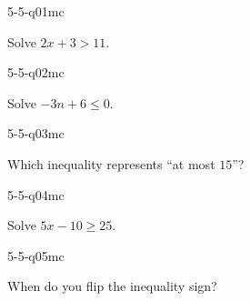 

\begin{practiceQuestion}{5-5-q01}{mc}
\begin{questionText}
Solve $2x + 3 > 11$.
\end{questionText}
\end{practiceQuestion}

\begin{practiceQuestion}{5-5-q02}{mc}
\begin{questionText}
Solve $-3n + 6 \leq 0$.
\end{questionText}
\end{practiceQuestion}

\begin{practiceQuestion}{5-5-q03}{mc}
\begin{questionText}
Which inequality represents ``at most $15$''?
\end{questionText}
\end{practiceQuestion}

\begin{practiceQuestion}{5-5-q04}{mc}
\begin{questionText}
Solve $5x - 10 \geq 25$.
\end{questionText}
\end{practiceQuestion}

\begin{practiceQuestion}{5-5-q05}{mc}
\begin{questionText}
When do you flip the inequality sign?
\end{questionText}
\end{practiceQuestion}

